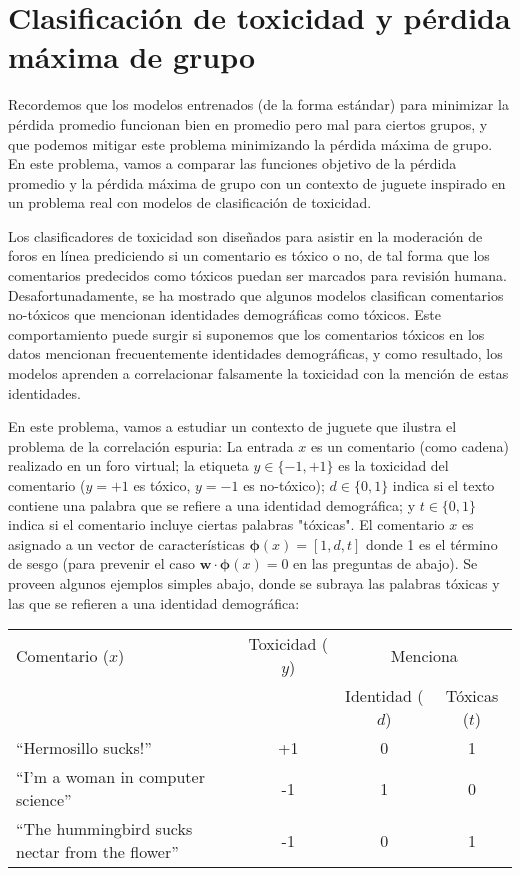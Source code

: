 \documentclass[11pt,letterpaper]{article}
\begin{document}

\section*{Clasificación de toxicidad y pérdida máxima de grupo}

Recordemos que los modelos entrenados (de la forma estándar) para minimizar la pérdida promedio funcionan bien en promedio pero mal para ciertos grupos, y que podemos mitigar este problema minimizando la pérdida máxima de grupo. En este problema, vamos a comparar las funciones objetivo de la pérdida promedio y la pérdida máxima de grupo con un contexto de juguete inspirado en un problema real con modelos de clasificación de toxicidad.

Los clasificadores de toxicidad son diseñados para asistir en la moderación de foros en línea prediciendo si un comentario es tóxico o no, de tal forma que los comentarios predecidos como tóxicos puedan ser marcados para revisión humana. Desafortunadamente, se ha mostrado que algunos modelos clasifican comentarios no-tóxicos que mencionan identidades demográficas como tóxicos. Este comportamiento puede surgir si suponemos que los comentarios tóxicos en los datos mencionan frecuentemente identidades demográficas, y como resultado, los modelos aprenden a correlacionar falsamente la toxicidad con la mención de estas identidades.

En este problema, vamos a estudiar un contexto de juguete que ilustra el problema de la correlación espuria: La entrada $x$ es un comentario (como cadena) realizado en un foro virtual; la etiqueta $y \in \{-1, +1\}$ es la toxicidad del comentario ($y = +1$ es tóxico, $y = -1$ es no-tóxico); $d \in \{0, 1\}$ indica si el texto contiene una palabra que se refiere a una identidad demográfica; y $t \in \{0, 1\}$ indica si el comentario incluye ciertas palabras "tóxicas". El comentario $x$ es asignado a un vector de características $\boldsymbol{\phi}(x) = [1, d, t]$ donde 1 es el término de sesgo (para prevenir el caso $\mathbf{w} \cdot \boldsymbol{\phi}(x) = 0$ en las preguntas de abajo). Se proveen algunos ejemplos simples abajo, donde se subraya las palabras tóxicas y las que se refieren a una identidad demográfica:

\begin{center}
    \begin{tabular}{|l||c|c|c|}
    \hline
    Comentario ($x$) & Toxicidad ($y$) & \multicolumn{2}{c|}{Menciona} \\ \cline{3-4}
    & & Identidad ($d$) & Tóxicas ($t$) \\ \hline
    ``Hermosillo sucks!'' & +1 & 0 & 1 \\ 
    ``I'm a woman in computer science'' & -1 & 1 & 0 \\ 
    ``The hummingbird sucks nectar from the flower'' & -1 & 0 & 1 \\ \hline
    \end{tabular}
\end{center}
\end{document}
